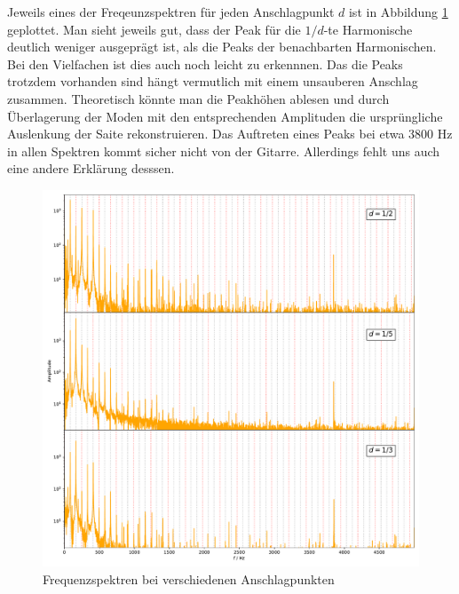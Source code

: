 Jeweils eines der Freqeunzspektren für jeden Anschlagpunkt $d$ ist in Abbildung \ref{anschlagSpec} geplottet. Man sieht jeweils gut, dass der Peak für die $1/d$-te Harmonische deutlich weniger ausgeprägt ist, als die Peaks der benachbarten Harmonischen. Bei den Vielfachen ist dies auch noch leicht zu erkennnen. Das die Peaks trotzdem vorhanden sind hängt vermutlich mit einem unsauberen Anschlag zusammen. Theoretisch könnte man die Peakhöhen ablesen und durch Überlagerung der Moden mit den entsprechenden Amplituden die ursprüngliche Auslenkung der Saite rekonstruieren. Das Auftreten eines Peaks bei etwa 3800 Hz in allen Spektren kommt sicher nicht von der Gitarre. Allerdings fehlt uns auch eine andere Erklärung desssen.
\begin{figure}[h]
	\centering
	\includegraphics[width=\linewidth]{plots/anschlagspektrum.pdf}
	\caption{Frequenzspektren bei verschiedenen Anschlagpunkten}
	\label{anschlagSpec}
\end{figure}





